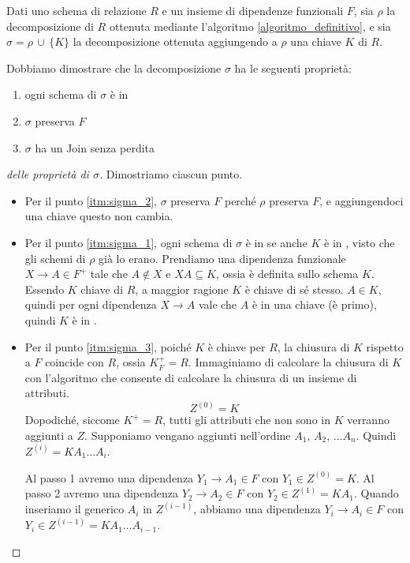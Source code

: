 Dati uno schema di relazione $R$ e un insieme di dipendenze funzionali $F$, sia $\rho$ la decomposizione di $R$ ottenuta mediante l'algoritmo \ref{algoritmo_definitivo}, e sia $\sigma = \rho \, \cup \, \{ K \}$ la decomposizione ottenuta aggiungendo a $\rho$ una chiave $K$ di $R$.

Dobbiamo dimostrare che la decomposizione $\sigma$ ha le seguenti propriet\`a:
\begin{enumerate}
    \item \label{itm:sigma_1} ogni schema di $\sigma$ \`e in 
    \item \label{itm:sigma_2} $\sigma$ preserva $F$
    \item \label{itm:sigma_3} $\sigma$ ha un Join senza perdita
\end{enumerate}

\begin{proof}[delle propriet\`a di $\sigma$]
Dimostriamo ciascun punto.
\begin{itemize}
    \item Per il punto \ref{itm:sigma_2}, $\sigma$ preserva $F$ perch\'e $\rho$ preserva $F$, e aggiungendoci una chiave questo non cambia.
    \item Per il punto \ref{itm:sigma_1}, ogni schema di $\sigma$ \`e in  se anche $K$ \`e in , visto che gli schemi di $\rho$ gi\`a lo erano. Prendiamo una dipendenza funzionale $X \to A \in F^+$ tale che $A \notin X$ e $XA \subseteq K$, ossia \`e definita sullo schema $K$. Essendo $K$ chiave di $R$, a maggior ragione $K$ \`e chiave di s\'e stesso. $A \in K$, quindi per ogni dipendenza $X \to A$ vale che $A$ \`e in una chiave (\`e primo), quindi $K$ \`e in .
    \item Per il punto \ref{itm:sigma_3}, poich\'e $K$ \`e chiave per $R$, la chiusura di $K$ rispetto a $F$ coincide con $R$, ossia $K^+_F = R$. Immaginiamo di calcolare la chiusura di $K$ con l'algoritmo che consente di calcolare la chiusura di un insieme di attributi.
    \[
    Z^{(0)} = K
    \]
    Dopodich\'e, siccome $K^+ = R$, tutti gli attributi che non sono in $K$ verranno aggiunti a $Z$. Supponiamo vengano aggiunti nell'ordine $A_1$, $A_2$, $\dots A_n$. Quindi $Z^{(i)} = K A_1 \dots A_i$.

    Al passo 1 avremo una dipendenza $Y_1 \to A_1 \in F$ con $Y_1 \in Z^{(0)} = K$. Al passo 2 avremo una dipendenza $Y_2 \to A_2 \in F$ con $Y_2 \in Z^{(1)} = K A_1$. Quando inseriamo il generico $A_i$ in $Z^{(i-1)}$, abbiamo una dipendenza $Y_i \to A_i \in F$ con $Y_i \in Z^{(i-1)} = K A_1 \dots A_{i-1}$.


\end{itemize}
\end{proof}

